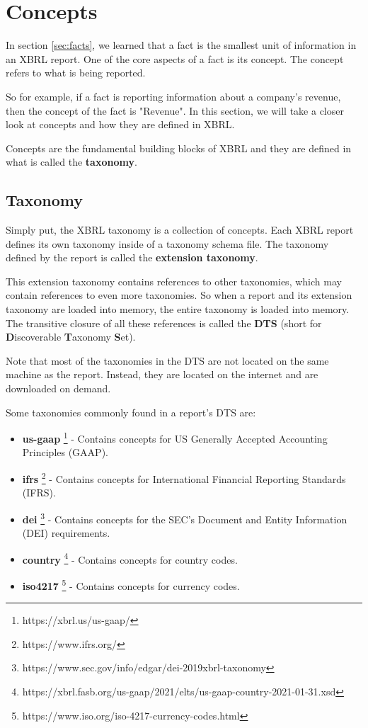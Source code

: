 \section{Concepts}
\label{sec:concepts}

In section \ref{sec:facts}, we learned that a fact is the smallest unit of information in an XBRL report. 
One of the core aspects of a fact is its concept. 
The concept refers to what is being reported. 

So for example, if a fact is reporting information about a company's revenue, then the concept of the fact is "Revenue".
In this section, we will take a closer look at concepts and how they are defined in XBRL.

Concepts are the fundamental building blocks of XBRL and they are defined in what is called the \textbf{taxonomy}.

\subsection{Taxonomy}

Simply put, the XBRL taxonomy is a collection of concepts. 
Each XBRL report defines its own taxonomy inside of a taxonomy schema file. 
The taxonomy defined by the report is called the \textbf{extension taxonomy}.

This extension taxonomy contains references to other taxonomies, which may contain references to even more taxonomies.
So when a report and its extension taxonomy are loaded into memory, the entire taxonomy is loaded into memory.
The transitive closure of all these references is called the \textbf{DTS} (short for \textbf{D}iscoverable \textbf{T}axonomy \textbf{S}et).

Note that most of the taxonomies in the DTS are not located on the same machine as the report.
Instead, they are located on the internet and are downloaded on demand.

Some taxonomies commonly found in a report's DTS are:

\begin{itemize}
    \item \textbf{us-gaap} \footnote{https://xbrl.us/us-gaap/} - Contains concepts for US Generally Accepted Accounting Principles (GAAP).
    \item \textbf{ifrs} \footnote{https://www.ifrs.org/} - Contains concepts for International Financial Reporting Standards (IFRS).
    \item \textbf{dei} \footnote{https://www.sec.gov/info/edgar/dei-2019xbrl-taxonomy} - Contains concepts for the SEC's Document and Entity Information (DEI) requirements.
    \item \textbf{country} \footnote{https://xbrl.fasb.org/us-gaap/2021/elts/us-gaap-country-2021-01-31.xsd} - Contains concepts for country codes.
    \item \textbf{iso4217} \footnote{https://www.iso.org/iso-4217-currency-codes.html} - Contains concepts for currency codes.
\end{itemize}

